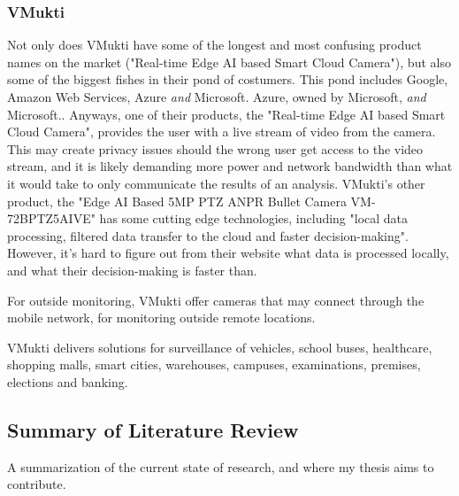 \subsubsection{VMukti} 
Not only does VMukti have some of the longest and most confusing product names on the market ("Real-time Edge AI based Smart Cloud Camera"), but also some of the biggest fishes in their pond of costumers. This pond includes Google, Amazon Web Services, Azure \textit{and} Microsoft. Azure, owned by Microsoft, \textit{and} Microsoft.. Anyways, one of their products, the "Real-time Edge AI based Smart Cloud Camera", provides the user with a live stream of video from the camera. This may create privacy issues should the wrong user get access to the video stream, and it is likely demanding more power and network bandwidth than what it would take to only communicate the results of an analysis. VMukti's other product, the "Edge AI Based 5MP PTZ ANPR Bullet Camera VM-72BPTZ5AIVE" has some cutting edge technologies, including "local data processing, filtered data transfer to the cloud and faster decision-making". However, it's hard to figure out from their website what data is processed locally, and what their decision-making is faster than.

For outside monitoring, VMukti offer cameras that may connect through the mobile network, for monitoring outside remote locations. 

VMukti delivers solutions for surveillance of vehicles, school buses, healthcare, shopping malls, smart cities, warehouses, campuses, examinations, premises, elections and banking.


\subsection{Summary of Literature Review}
A summarization of the current state of research, and where my thesis aims to contribute.
